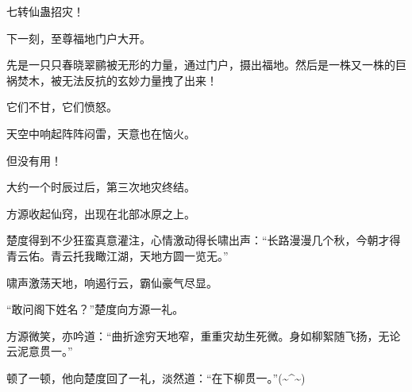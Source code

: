 \begin{this_body}
七转仙蛊招灾！

下一刻，至尊福地门户大开。

先是一只只春晓翠鹂被无形的力量，通过门户，摄出福地。然后是一株又一株的巨祸焚木，被无法反抗的玄妙力量拽了出来！

它们不甘，它们愤怒。

天空中响起阵阵闷雷，天意也在恼火。

但没有用！

大约一个时辰过后，第三次地灾终结。

方源收起仙窍，出现在北部冰原之上。

楚度得到不少狂蛮真意灌注，心情激动得长啸出声：“长路漫漫几个秋，今朝才得青云佑。青云托我瞰江湖，天地方圆一览无。”

啸声激荡天地，响遏行云，霸仙豪气尽显。

“敢问阁下姓名？”楚度向方源一礼。

方源微笑，亦吟道：“曲折途穷天地窄，重重灾劫生死微。身如柳絮随飞扬，无论云泥意贯一。”

顿了一顿，他向楚度回了一礼，淡然道：“在下柳贯一。”(\~{}\^{}\~{})

\end{this_body}

